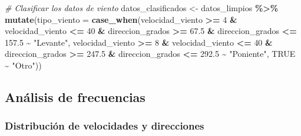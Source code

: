 \documentclass[
]{article}
\newenvironment{Shaded}{\begin{snugshade}}{\end{snugshade}}
\newcommand{\AttributeTok}[1]{\textcolor[rgb]{0.13,0.29,0.53}{#1}}
\newcommand{\CommentTok}[1]{\textcolor[rgb]{0.56,0.35,0.01}{\textit{#1}}}
\newcommand{\ConstantTok}[1]{\textcolor[rgb]{0.56,0.35,0.01}{#1}}
\newcommand{\DecValTok}[1]{\textcolor[rgb]{0.00,0.00,0.81}{#1}}
\newcommand{\FloatTok}[1]{\textcolor[rgb]{0.00,0.00,0.81}{#1}}
\newcommand{\FunctionTok}[1]{\textcolor[rgb]{0.13,0.29,0.53}{\textbf{#1}}}
\newcommand{\NormalTok}[1]{#1}
\newcommand{\OtherTok}[1]{\textcolor[rgb]{0.56,0.35,0.01}{#1}}
\newcommand{\SpecialCharTok}[1]{\textcolor[rgb]{0.81,0.36,0.00}{\textbf{#1}}}
\newcommand{\StringTok}[1]{\textcolor[rgb]{0.31,0.60,0.02}{#1}}
\begin{document}
\begin{Shaded}
\begin{Highlighting}[]
\CommentTok{\# Clasificar los datos de viento}
\NormalTok{datos\_clasificados }\OtherTok{\textless{}{-}}\NormalTok{ datos\_limpios }\SpecialCharTok{\%\textgreater{}\%}
    \FunctionTok{mutate}\NormalTok{(}\AttributeTok{tipo\_viento =} \FunctionTok{case\_when}\NormalTok{(velocidad\_viento }\SpecialCharTok{\textgreater{}=}
        \DecValTok{4} \SpecialCharTok{\&}\NormalTok{ velocidad\_viento }\SpecialCharTok{\textless{}=} \DecValTok{40} \SpecialCharTok{\&}\NormalTok{ direccion\_grados }\SpecialCharTok{\textgreater{}=}
        \FloatTok{67.5} \SpecialCharTok{\&}\NormalTok{ direccion\_grados }\SpecialCharTok{\textless{}=} \FloatTok{157.5} \SpecialCharTok{\textasciitilde{}}
        \StringTok{"Levante"}\NormalTok{, velocidad\_viento }\SpecialCharTok{\textgreater{}=} \DecValTok{8} \SpecialCharTok{\&}
\NormalTok{        velocidad\_viento }\SpecialCharTok{\textless{}=} \DecValTok{40} \SpecialCharTok{\&}\NormalTok{ direccion\_grados }\SpecialCharTok{\textgreater{}=}
        \FloatTok{247.5} \SpecialCharTok{\&}\NormalTok{ direccion\_grados }\SpecialCharTok{\textless{}=} \FloatTok{292.5} \SpecialCharTok{\textasciitilde{}}
        \StringTok{"Poniente"}\NormalTok{, }\ConstantTok{TRUE} \SpecialCharTok{\textasciitilde{}} \StringTok{"Otro"}\NormalTok{))}
\end{Highlighting}
\end{Shaded}

\subsection{Análisis de frecuencias}\label{anuxe1lisis-de-frecuencias}

\subsubsection{Distribución de velocidades y direcciones}\label{distribuciuxf3n-de-velocidades-y-direcciones}
\end{document}
